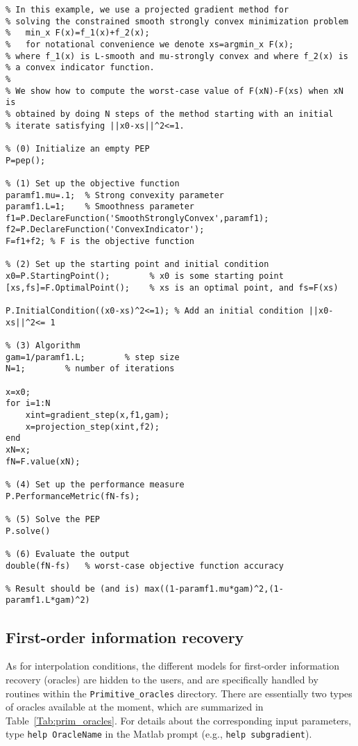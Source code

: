 \documentclass[11pt,a4paper]{article}
\begin{document}
\begin{lstlisting}
% In this example, we use a projected gradient method for
% solving the constrained smooth strongly convex minimization problem
%   min_x F(x)=f_1(x)+f_2(x); 
%   for notational convenience we denote xs=argmin_x F(x);
% where f_1(x) is L-smooth and mu-strongly convex and where f_2(x) is
% a convex indicator function.
%
% We show how to compute the worst-case value of F(xN)-F(xs) when xN is
% obtained by doing N steps of the method starting with an initial
% iterate satisfying ||x0-xs||^2<=1.

% (0) Initialize an empty PEP
P=pep();

% (1) Set up the objective function
paramf1.mu=.1;	% Strong convexity parameter
paramf1.L=1;    % Smoothness parameter
f1=P.DeclareFunction('SmoothStronglyConvex',paramf1);
f2=P.DeclareFunction('ConvexIndicator');
F=f1+f2; % F is the objective function

% (2) Set up the starting point and initial condition
x0=P.StartingPoint();		 % x0 is some starting point
[xs,fs]=F.OptimalPoint(); 	 % xs is an optimal point, and fs=F(xs)

P.InitialCondition((x0-xs)^2<=1); % Add an initial condition ||x0-xs||^2<= 1

% (3) Algorithm
gam=1/paramf1.L;		% step size
N=1;		% number of iterations

x=x0;
for i=1:N
    xint=gradient_step(x,f1,gam);
    x=projection_step(xint,f2);
end
xN=x;
fN=F.value(xN);

% (4) Set up the performance measure
P.PerformanceMetric(fN-fs);

% (5) Solve the PEP
P.solve()

% (6) Evaluate the output
double(fN-fs)   % worst-case objective function accuracy

% Result should be (and is) max((1-paramf1.mu*gam)^2,(1-paramf1.L*gam)^2)
\end{lstlisting}
\newpage
\subsection{First-order information recovery}\label{sec:oracles}
As for interpolation conditions, the different models for first-order information recovery (oracles) are hidden to the users, and are specifically handled by routines within the \verb?Primitive_oracles? directory. There are essentially two types of oracles available at the moment, which are summarized in Table~\ref{Tab:prim_oracles}.  For details about the corresponding input parameters, type \verb?help OracleName? in the Matlab prompt (e.g., \verb?help subgradient?).
\end{document}
